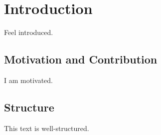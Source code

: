 \chapter{Introduction}

	Feel introduced.
	
	\section{Motivation and Contribution}
	
		I am motivated.
	
	\section{Structure}
	
		This text is well-structured.